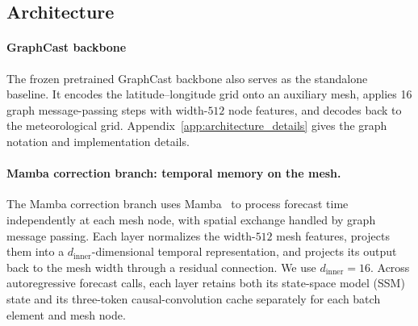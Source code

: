 \documentclass{article}
\newcommand{\vfourchange}[1]{{\color{blue}#1}}
\newcommand{\vfourred}[1]{{\color{red}#1}}
\newif\ifvfivechanges
\newcommand{\vfiveidentity}[1]{#1}
\DeclareRobustCommand{\vfiveadded}[1]{\ifvfivechanges{\color{vfiveAdded}%
  \let\vfourchange\vfiveidentity\let\vfourred\vfiveidentity#1}\else{\color{blue}%
  \let\vfourchange\vfiveidentity\let\vfourred\vfiveidentity#1}\fi}
\begin{document}
\subsection{{Architecture}}

\paragraph{{GraphCast backbone}}
\ifvfivechanges
\par\begingroup\color{vfiveDeleted}\noindent
\sout{The frozen GraphCast backbone uses a pretrained checkpoint and also serves as the standalone forecast baseline. This graph neural network operates on a latitude--longitude grid and an auxiliary mesh, with graph $\mathcal{G}(\mathcal{V}^{\textrm{G}},\mathcal{V}^{\textrm{M}},\mathcal{E}^{\textrm{G2M}},\mathcal{E}^{\textrm{M}},\mathcal{E}^{\textrm{M2G}})$. The vertices $\mathcal{V}^{\textrm{G}}$ represent the meteorological grid and $\mathcal{V}^{\textrm{M}}$ the mesh. Encoding uses grid-to-mesh edges $\mathcal{E}^{\textrm{G2M}}$, followed by $N=16$ graph message-passing steps over $\mathcal{E}^{\textrm{M}}$ and decoding over mesh-to-grid edges $\mathcal{E}^{\textrm{M2G}}$. Latent node features have width $W_{\textrm{GC}}=512$. The mesh provides a more compact representation for spatial processing than the meteorological grid.}
\par\endgroup
\fi
\vfiveadded{The frozen pretrained GraphCast backbone also serves as the standalone baseline. It encodes the latitude--longitude grid onto an auxiliary mesh, applies 16 graph message-passing steps with width-$512$ node features, and decodes back to the meteorological grid. Appendix~\ref{app:architecture_details} gives the graph notation and implementation details.}

\paragraph{{Mamba correction branch: temporal memory on the mesh.}}
The Mamba correction branch uses Mamba~\citep{gu2023mamba} to process forecast time independently at each mesh node, with spatial exchange handled by graph message passing. Each layer normalizes the width-$512$ mesh features, projects them into a $d_{\mathrm{inner}}$-dimensional temporal representation, and projects its output back to the mesh width through a residual connection. We use $d_{\mathrm{inner}}=16$. Across autoregressive forecast calls, each layer retains both its {state-space model (SSM) state} and its three-token causal-convolution cache separately for each batch element and mesh node.
\end{document}

